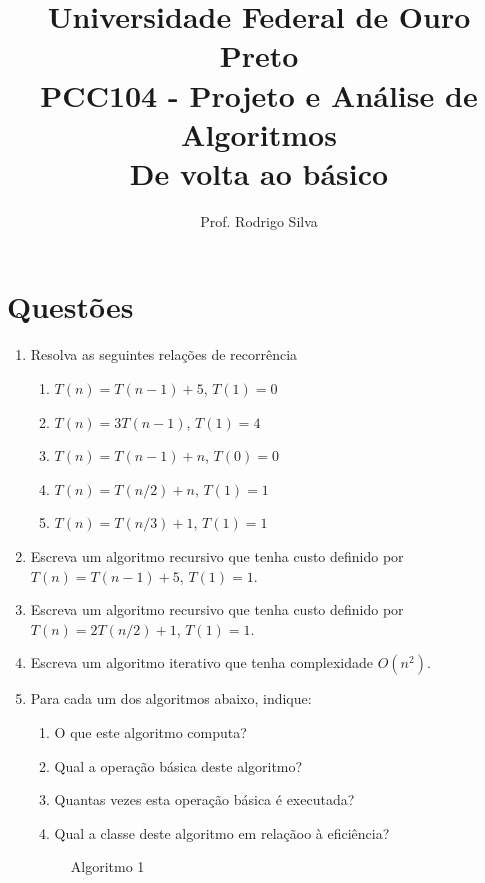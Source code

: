 \documentclass{article}
\title{\vspace{-2 cm}Universidade Federal de Ouro Preto \\ PCC104 - Projeto e Análise de Algoritmos \\ De volta ao básico}
\author{Prof. Rodrigo Silva}
\begin{document}
\maketitle

\section*{Questões}

\begin{enumerate}

    \item Resolva as seguintes relações de recorrência
    
    \begin{enumerate}
        \item $T(n) = T(n-1) + 5$, $T(1)=0$
        \item $T(n) = 3T(n-1)$, $T(1)=4$
        \item $T(n) = T(n-1) + n$, $T(0)=0$
        \item $T(n) = T(n/2) + n$, $T(1)=1$
        \item $T(n) = T(n/3) + 1$, $T(1)=1$
    \end{enumerate}


    \item Escreva um algoritmo recursivo que tenha custo definido por $T(n) = T(n-1) + 5$, $T(1)=1$. 
   
    \item Escreva um algoritmo recursivo que tenha custo definido por $T(n) = 2T(n/2) + 1$, $T(1)=1$.
    
    \item Escreva um algoritmo iterativo que tenha complexidade $O(n^2)$.

    \item Para cada um dos algoritmos abaixo, indique:
    
    \begin{enumerate}
        \item O que este algoritmo computa?
        \item Qual a operação básica deste algoritmo?
        \item Quantas vezes esta operação básica é executada?
        \item Qual a classe deste algoritmo em relaçãoo à eficiência?
    \end{enumerate}


    \begin{figure}[!ht]
        
        \caption{Algoritmo 1}
    \end{figure}


\end{enumerate}
\end{document}
